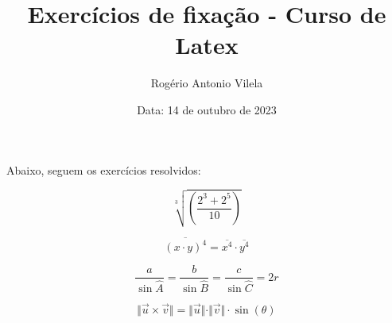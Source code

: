 \documentclass[a4paper, 12pt]{article}
\title{\textbf{Exercícios de fixação - Curso de Latex}}
\author{Rogério Antonio Vilela}
\date{Data: 14 de outubro de 2023}
\begin{document}
\maketitle

Abaixo, seguem os exercícios resolvidos:

\begin{equation}
\sqrt[3]{\left( \frac{2^{3} + 2^{5}}{10}\right)}
\end{equation}

\begin{equation}
\overline{(x \cdot y)^4} = \overline{x^{4}} \cdot \overline{y^{4}}
\end{equation}

\begin{equation}
\frac{a}{\sin \widehat{A}} = \frac{b}{\sin \widehat{B}} = \frac{c}{\sin \widehat{C}} = 2r
\end{equation}

\begin{equation}
\Vert\vec{u} \times \vec{v} \Vert = \Vert \vec{u} \Vert \cdot \Vert \vec{v} \Vert \cdot \sin(\theta)
\end{equation}
\end{document}
